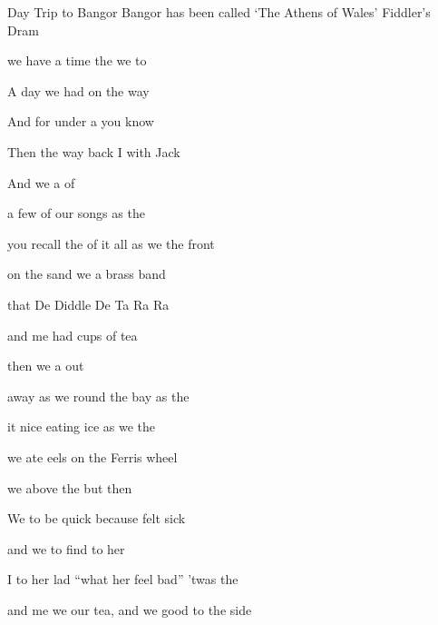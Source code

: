 \begin{SBSong}{Day Trip to Bangor}
  {Bangor has been called `The Athens of Wales'}
  {Fiddler's Dram}
  \begin{SBChorus}
	 we have a  time the  we  to 

	A  day we had  on the way
                       
	And  for under a  you know

	Then  the way back I  with Jack
   
	And we  a  of 

	 a few of our  songs as the   
  \end{SBChorus}
  \begin{SBVerse}
	 you recall the  of it all as we   the  front
	
	 on the sand we  a brass band 
	
	that  De Diddle De  Ta Ra Ra
	
	 and me had  cups of tea 
	
	then we  a   out
	
	 away as we  round the bay as the   
  \end{SBVerse}
  
  \begin{SBVerse}
	 it nice eating  ice as we   the 
	
	 we ate eels on the  Ferris wheel 
	
	we  above the  but then
	
	We  to be quick because  felt sick 
	
	and we  to find  to  her
	
	I  to her lad ``what  her feel bad'' 'twas the   
  \end{SBVerse}
  \begin{SBVerse}
	 and me we  our tea, and we  good to the  side
	

\end{SBVerse}
\end{SBSong}
